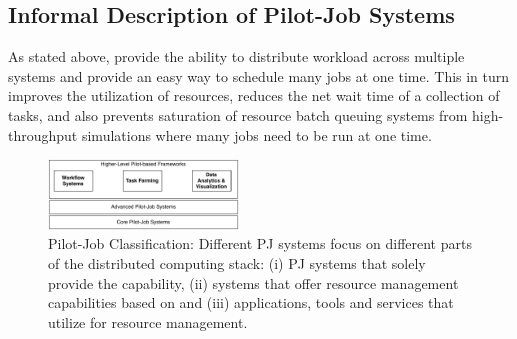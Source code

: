 \documentclass{sig-alternate}
\begin{document}
\subsection{Informal Description of Pilot-Job Systems}
\label{ssec:informal}


As stated above, \pilotjobs provide the ability to distribute workload
across multiple systems and provide an easy way to schedule many jobs
at one time. This in turn improves the utilization of resources,
reduces the net wait time of a collection of tasks, and also prevents
saturation of resource batch queuing systems from high-throughput
simulations where many jobs need to be run at one time.


\begin{figure}[t]
	\centering
		\includegraphics[width=0.45\textwidth]{figures/classification}
	\caption{Pilot-Job Classification: Different PJ systems focus
          on different parts of the distributed computing stack: (i)
          PJ systems that solely provide the \pilot capability, (ii)
          systems that offer resource management capabilities based on
          \pilots and (iii) applications, tools and services that
          utilize \pilots for resource management. }  
	\label{fig:figures_classification}
\end{figure}
\end{document}
